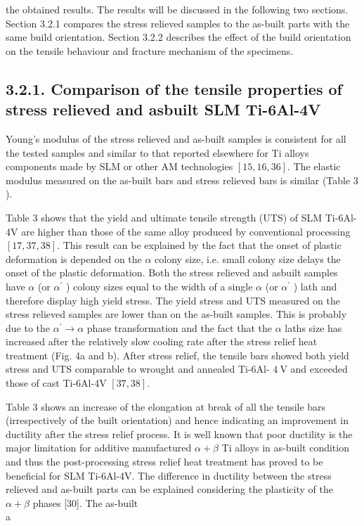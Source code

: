 \documentclass[10pt]{article}
\begin{document}
the obtained results. The results will be discussed in the following two sections. Section 3.2.1 compares the stress relieved samples to the as-built parts with the same build orientation. Section 3.2.2 describes the effect of the build orientation on the tensile behaviour and fracture mechanism of the specimens.

\subsection*{3.2.1. Comparison of the tensile properties of stress relieved and asbuilt SLM Ti-6Al-4V}
Young's modulus of the stress relieved and as-built samples is consistent for all the tested samples and similar to that reported elsewhere for Ti alloys components made by SLM or other AM technologies $[15,16,36]$. The elastic modulus measured on the as-built bars and stress relieved bars is similar (Table 3 ).

Table 3 shows that the yield and ultimate tensile strength (UTS) of SLM Ti-6Al-4V are higher than those of the same alloy produced by conventional processing $[17,37,38]$. This result can be explained by the fact that the onset of plastic deformation is depended on the $\alpha$ colony size, i.e. small colony size delays the onset of the plastic deformation. Both the stress relieved and asbuilt samples have $\alpha$ (or $\alpha^{\prime}$ ) colony sizes equal to the width of a single $\alpha$ (or $\alpha^{\prime}$ ) lath and therefore display high yield stress. The yield stress and UTS measured on the stress relieved samples are lower than on the as-built samples. This is probably due to the $\alpha^{\prime} \rightarrow \alpha$ phase transformation and the fact that the $\alpha$ laths size has increased after the relatively slow cooling rate after the stress relief heat treatment (Fig. 4a and b). After stress relief, the tensile bars showed both yield stress and UTS comparable to wrought and annealed Ti-6Al- $4 \mathrm{~V}$ and exceeded those of cast Ti-6Al-4V $[37,38]$.

Table 3 shows an increase of the elongation at break of all the tensile bars (irrespectively of the built orientation) and hence indicating an improvement in ductility after the stress relief process. It is well known that poor ductility is the major limitation for additive manufactured $\alpha+\beta$ Ti alloys in as-built condition and thus the post-processing stress relief heat treatment has proved to be beneficial for SLM Ti-6Al-4V. The difference in ductility between the stress relieved and as-built parts can be explained considering the plasticity of the $\alpha+\beta$ phases [30]. The as-built\\
a
\end{document}
